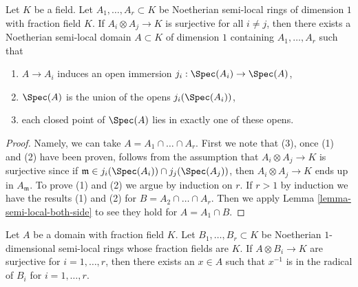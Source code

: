 \begin{lemma}
\label{lemma-glue-a-bunch-of-local-rings}
Let $K$ be a field. Let $A_1, \ldots, A_r \subset K$ be Noetherian
semi-local rings of dimension $1$ with fraction field $K$. If
$A_i \otimes A_j \to K$ is surjective for all $i \not = j$, then
there exists a Noetherian semi-local domain $A \subset K$
of dimension $1$ containing $A_1, \ldots, A_r$ such that
\begin{enumerate}
\item $A \to A_i$ induces an open immersion $j_i : \Spec(A_i) \to \Spec(A)$,
\item $\Spec(A)$ is the union of the opens $j_i(\Spec(A_i))$,
\item each closed point of $\Spec(A)$ lies in exactly one of these
opens.
\end{enumerate}
\end{lemma}

\begin{proof}
Namely, we can take $A = A_1 \cap \ldots \cap A_r$. First we note that (3),
once (1) and (2) have been proven, follows from the assumption that
$A_i \otimes A_j \to K$ is surjective since if
$\mathfrak m \in j_i(\Spec(A_i)) \cap j_j(\Spec(A_j))$, then
$A_i \otimes A_j \to K$ ends up in $A_\mathfrak m$.
To prove (1) and (2) we argue by induction on $r$.
If $r > 1$ by induction we have the results (1) and (2) for
$B = A_2 \cap \ldots \cap A_r$. Then we apply
Lemma \ref{lemma-semi-local-both-side} to see they hold for
$A = A_1 \cap B$.
\end{proof}

\begin{lemma}
\label{lemma-create-globally-generated}
Let $A$ be a domain with fraction field $K$. Let $B_1, \ldots, B_r \subset K$
be Noetherian $1$-dimensional semi-local rings whose fraction
fields are $K$. If $A \otimes B_i \to K$ are surjective for $i = 1, \ldots, r$,
then there exists an $x \in A$ such that $x^{-1}$ is in the radical of
$B_i$ for $i = 1, \ldots, r$.
\end{lemma}

